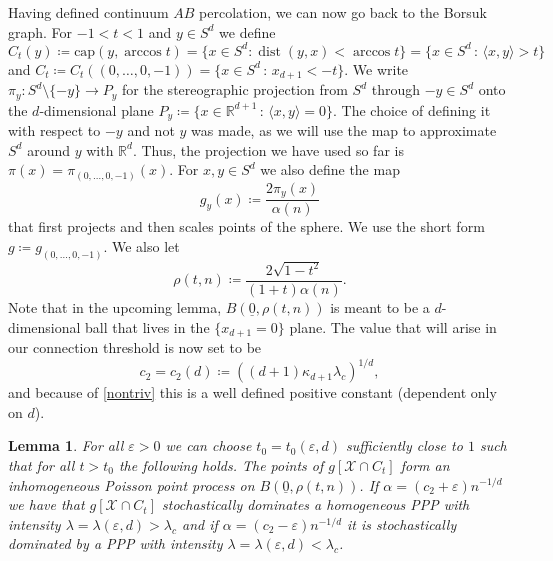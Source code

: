 \documentclass[11pt]{article}%
\newtheorem{lemma}[lemma]{Lemma}
\newcommand{\eps}{\varepsilon}
\DeclareMathOperator{\dist}{dist}
\newcommand{\RR}{\mathbb{R}}
\newcommand{\typ}{\underline{0}}
\begin{document}
\noindent
Having defined continuum $AB$ percolation, we can now go back to the Borsuk graph. For $ -1<t<1 $ and $ y\in S^d $ we define 
\begin{equation*}
	C_t(y)\coloneqq \text{cap}(y,\arccos{t})=\{ x \in S^d : \dist(y,x) < \arccos{t} \}=\{x\in S^d\,:\, \langle x,y\rangle >t\}
\end{equation*}
and $ C_t\coloneqq C_t((0,\dots,0,-1)) =\{x\in S^d\,:\,x_{d+1}<-t\}$. We write $ \pi_{y}:S^d\setminus\{-y\}\to P_y $ for the stereographic projection  from $ S^{d} $ through $ -y\in S^{d} $ onto the $ d$-dimensional plane $P_y\coloneqq \{x\in \RR^{d+1} \,:\, \langle x,y\rangle=0\} $. The choice of defining it with respect to $ -y $ and not $ y $ was made, as we will use the map to approximate $ S^d $ around $ y $ with $ \RR^d $. Thus, the projection we have used so far is $\pi(x)=\pi_{(0,\dots,0,-1)}(x)$. For $ x,y\in S^d $ we also define the map
\begin{equation*}
	g_y(x)\coloneqq  \frac{2\pi_y(x)}{\alpha(n)}
\end{equation*}
that first projects and then scales points of the sphere. We use the short form $g\coloneqq g_{(0,\dots,0,-1)}$. We also let 
\begin{equation*}
	\rho(t,n)\coloneqq \frac{2\sqrt{1-t^2}}{(1+t)\alpha(n)}.
\end{equation*}
Note that in the upcoming lemma,  $ B(\typ,\rho(t,n)) $ is meant to be a $ d $-dimensional ball that lives in the $ \{x_{d+1}=0\}$ plane. 
The value that will arise in our connection threshold is now set to be 
\begin{equation*}
	c_2=c_2(d)\coloneqq {((d+1)\kappa_{d+1}\lambda_c)^{1/d}},
\end{equation*}
and because of \cref{nontriv} this is a well defined positive constant (dependent only on $d$).

\begin{lemma}\label{ppp}
For all $\eps>0$ we can choose $ t_0=t_0(\eps,d) $ sufficiently close to 
$1$ such that for all $t>t_0$ the following holds. 
The points of $ g[\mathcal{X}\cap C_t] $ form an inhomogeneous Poisson point process on 
$ B(\typ,\rho(t,n)) $. If $\alpha=(c_2+\eps)n^{-1/d}$ we have that $ g[\mathcal{X}\cap C_t] $ 
stochastically dominates a homogeneous PPP with intensity $ \lambda=\lambda(\eps,d)>\lambda_c $ and 
if $\alpha=(c_2-\eps)n^{-1/d}$ it is stochastically dominated by a PPP with intensity $ \lambda=\lambda(\eps,d)<\lambda_c $.
\end{lemma}
\end{document}
